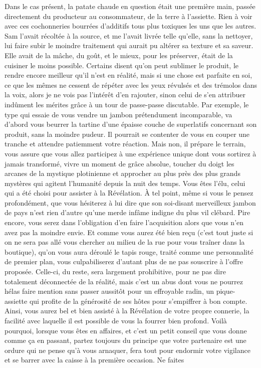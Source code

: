 Dans le cas présent, la patate chaude en question était une première main, passée directement du producteur au consommateur, de la terre à l’assiette. Rien à voir avec ces cochonneries bourrées d’additifs tous plus toxiques les uns que les autres. Sam l’avait récoltée à la source, et me l’avait livrée telle qu’elle, sans la nettoyer, lui faire subir le moindre traitement qui aurait pu altérer sa texture et sa saveur. Elle avait de la mâche, du goût, et le mieux, pour les préserver, était de la cuisiner le moins possible. Certains disent qu’on peut sublimer le produit, le rendre encore meilleur qu’il n’est en réalité, mais si une chose est parfaite en soi, ce que les mêmes ne cessent de répéter avec les yeux révulsés et des trémolos dans la voix, alors je ne vois pas l’intérêt d’en rajouter, sinon celui de s’en attribuer indûment les mérites grâce à un tour de passe-passe discutable. Par exemple, le type qui essaie de vous vendre un jambon prétendument incomparable, va d’abord vous beurrer la tartine d’une épaisse couche de superlatifs concernant son produit, sans la moindre pudeur. Il pourrait se contenter de vous en couper une tranche et attendre patiemment votre réaction. Mais non, il prépare le terrain, vous assure que vous allez participez à une expérience unique dont vous sortirez à jamais transformé, vivre un moment de grâce absolue, toucher du doigt les arcanes de la mystique plotinienne et approcher au plus près des plus grands mystères qui agitent l’humanité depuis la nuit des temps. Vous êtes l’élu, celui qui a été choisi pour assister à la Révélation. À tel point, même si vous le pensez profondément, que vous hésiterez à lui dire que son soi-disant merveilleux jambon de pays n’est rien d’autre qu’une merde infâme indigne du plus vil clébard. Pire encore, vous serez dans l’obligation d’en faire l’acquisition alors que vous n’en avez pas la moindre envie. Et comme vous aurez été bien reçu (c’est tout juste si on ne sera pas allé vous chercher au milieu de la rue pour vous traîner dans la boutique), qu’on vous aura déroulé le tapis rouge, traité comme une personnalité de premier plan, vous culpabiliserez d’autant plus de ne pas souscrire à l’offre proposée. Celle-ci, du reste, sera largement prohibitive, pour ne pas dire totalement déconnectée de la réalité, mais c’est un abus dont vous ne pourrez hélas faire mention sans passer aussitôt pour un effroyable radin, un pique-assiette qui profite de la générosité de ses hôtes pour s’empiffrer à bon compte. Ainsi, vous aurez bel et bien assisté à la Révélation de votre propre connerie, la facilité avec laquelle il est possible de vous la fourrer bien profond. Voilà pourquoi, lorsque vous êtes en affaires, et c’est un petit conseil que vous donne comme ça en passant, partez toujours du principe que votre partenaire est une ordure qui ne pense qu’à vous arnaquer, fera tout pour endormir votre vigilance et se barrer avec la caisse à la première occasion. Ne faites 